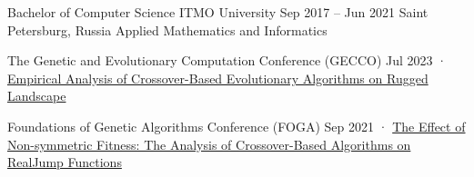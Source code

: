 \documentclass[11pt, a4paper]{style}
\begin{document}
\begin{paracol}{2}
    \cvEntry
        {Bachelor of Computer Science} {ITMO University}
        {Sep 2017 -- Jun 2021} {}
        {Saint Petersburg, Russia}
        {
            \vspace{-1mm}
            Applied Mathematics and Informatics
        }



    \cvEntry
        {The Genetic and Evolutionary Computation Conference (GECCO)} {} {} {} {}
        {
            \vspace{1.5mm}
            Jul 2023 · \href{https://dl.acm.org/doi/10.1145/3583133.3596328}{Empirical Analysis of Crossover-Based Evolutionary Algorithms on Rugged Landscape}
        }

    \cvEntry
        {Foundations of Genetic Algorithms Conference (FOGA)} {} {} {} {}
        {
            \vspace{1.5mm}
            Sep 2021 · \href{https://dl.acm.org/doi/10.1145/3450218.3477311}{The Effect of Non-symmetric Fitness: The Analysis of Crossover-Based Algorithms on RealJump Functions}
        }


\switchcolumn



    \vspace{-1mm}




\end{paracol}
\end{document}
